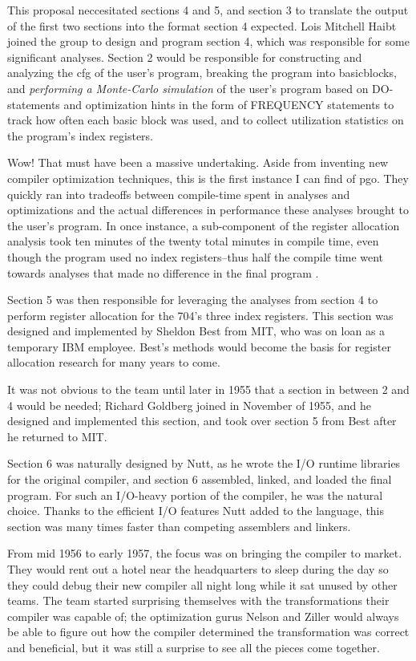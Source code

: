 This proposal neccesitated sections 4 and 5, and section 3 to translate the
output of the first two sections into the format section 4 expected.
Lois Mitchell Haibt joined the group to design and program section 4,
which was responsible for some significant analyses.
Section 2 would be responsible for constructing and analyzing the \gls{cfg}
of the user's program, breaking the program into \gls{basicblock}s,
and \textit{performing a Monte-Carlo simulation} of the user's program
based on DO-statements and optimization hints in the form of FREQUENCY statements
to track how often each basic block was used, and to collect utilization
statistics on the program's index registers.

Wow! That must have been a massive undertaking.
Aside from inventing new compiler optimization techniques, this is the first
instance I can find of \gls{pgo}.
They quickly ran into tradeoffs between compile-time spent in analyses and optimizations
and the actual differences in performance these analyses brought to the user's
program.
In once instance, a sub-component of the register allocation analysis took ten minutes
of the twenty total minutes in compile time,
even though the program used no index registers--thus half the compile time
went towards analyses that made no difference in the final program
\cite{backus_heising_fortran_1964}.

Section 5 was then responsible for leveraging the analyses from section 4
to perform register allocation for the 704's three index registers.
This section was designed and implemented by Sheldon Best from MIT,
who was on loan as a temporary IBM employee.
Best's methods would become the basis for register allocation research for many years to come.

It was not obvious to the team until later in 1955 that a section in
between 2 and 4 would be needed; Richard Goldberg joined in November of 1955,
and he designed and implemented this section,
and took over section 5 from Best after he returned to MIT.

Section 6 was naturally designed by Nutt, as he wrote the I/O runtime libraries
for the original compiler, and section 6 assembled, linked, and loaded the final program.
For such an I/O-heavy portion of the compiler, he was the natural choice.
Thanks to the efficient I/O features Nutt added to the language, this section
was many times faster than competing assemblers and linkers.

From mid 1956 to early 1957, the focus was on bringing the compiler to market.
They would rent out a hotel near the headquarters to sleep during the day
so they could debug their new compiler all night long while it sat unused by other
teams.
The team started surprising themselves with the transformations their compiler
was capable of; the optimization gurus Nelson and Ziller would always be able to figure
out how the compiler determined the transformation was correct and beneficial, but
it was still a surprise to see all the pieces come together.

